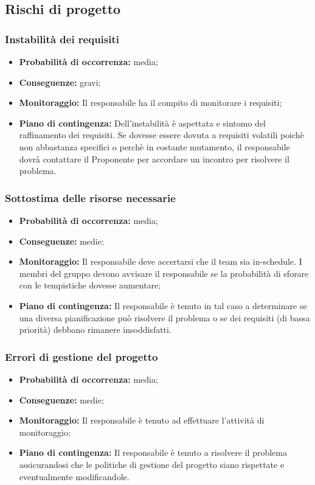 \subsection{Rischi di progetto}
\subsubsection{Instabilità dei requisiti}
\begin{itemize}
\item \textbf{Probabilità di occorrenza:} media;
\item \textbf{Conseguenze:} gravi;
\item \textbf{Monitoraggio:} Il responsabile ha il compito di monitorare i requisiti;
\item \textbf{Piano di contingenza:} Dell'instabilità è aspettata e sintomo del raffinamento dei requisiti.	Se dovesse essere dovuta a requisiti volatili poichè non abbastanza specifici o perchè in costante mutamento, il responsabile dovrà contattare il Proponente per accordare un incontro per risolvere il problema.
\end{itemize}
\subsubsection{Sottostima delle risorse necessarie}
\begin{itemize}
\item \textbf{Probabilità di occorrenza:} media;
\item \textbf{Conseguenze:} medie;
\item \textbf{Monitoraggio:} Il responsabile deve accertarsi che il team sia in-schedule. I membri del gruppo devono avvisare il responsabile se la probabilità di sforare con le tempistiche dovesse aumentare;
\item \textbf{Piano di contingenza:} Il responsabile è tenuto in tal caso a determinare se una diversa pianificazione può risolvere il problema o se dei requisiti (di bassa priorità) debbano rimanere insoddisfatti.
\end{itemize}
\subsubsection{Errori di gestione del progetto}
\begin{itemize}
\item \textbf{Probabilità di occorrenza:} media;
\item \textbf{Conseguenze:} medie;
\item \textbf{Monitoraggio:} Il responsabile è tenuto ad effettuare l'attività di monitoraggio;
\item \textbf{Piano di contingenza:} Il responsabile è tenuto a risolvere il problema assicurandosi che le politiche	di gestione del progetto siano rispettate e eventualmente modificandole.
\end{itemize}
\pagebreak